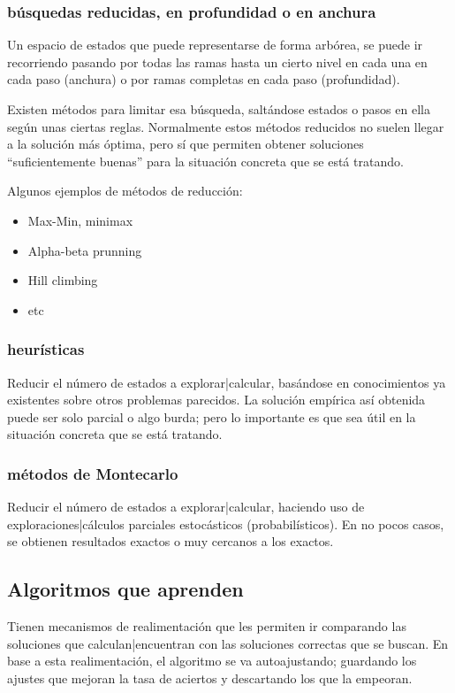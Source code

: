\documentclass[spanish,12pt,a4paper,final,oneside]{book}
\begin{document}
\subsubsection{búsquedas reducidas, en profundidad o en anchura}
Un espacio de estados que puede representarse de forma arbórea, se puede ir recorriendo pasando por todas las ramas hasta un cierto nivel en cada una en cada paso (anchura) o por ramas completas en cada paso (profundidad).

Existen métodos para limitar esa búsqueda, saltándose estados o pasos en ella según unas ciertas reglas. Normalmente estos métodos reducidos no suelen llegar a la solución más óptima, pero sí que permiten obtener soluciones ``suficientemente buenas'' para la situación concreta que se está tratando.

Algunos ejemplos de métodos de reducción:
\begin{itemize}
\item Max-Min, minimax
\item Alpha-beta prunning
\item Hill climbing
\item etc
\end{itemize}

\subsubsection{heurísticas}
Reducir el número de estados a explorar|calcular, basándose en conocimientos ya existentes sobre otros problemas parecidos. La solución empírica así obtenida puede ser solo parcial o algo burda; pero lo importante es que sea útil en la situación concreta que se está tratando.

\subsubsection{métodos de Montecarlo}
Reducir el número de estados a explorar|calcular, haciendo uso de exploraciones|cálculos parciales estocásticos (probabilísticos). En no pocos casos, se obtienen resultados exactos o muy cercanos a los exactos.

\subsection{Algoritmos que aprenden}
Tienen mecanismos de realimentación que les permiten ir comparando las soluciones que calculan|encuentran con las soluciones correctas que se buscan. En base a esta realimentación, el algoritmo se va autoajustando; guardando los ajustes que mejoran la tasa de aciertos y descartando los que la empeoran.
\end{document}
